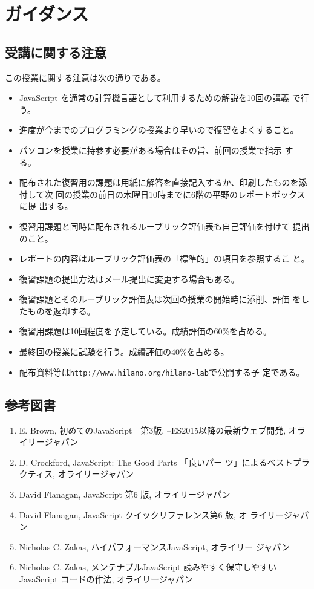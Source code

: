 \chapter{ガイダンス}
\section{受講に関する注意}
この授業に関する注意は次の通りである。
\begin{itemize}
 \item JavaScript を通常の計算機言語として利用するための解説を10回の講義
       で行う。
 \item 進度が今までのプログラミングの授業より早いので復習をよくすること。
 \item パソコンを授業に持参す必要がある場合はその旨、前回の授業で指示
       する。
  \item 配布された復習用の課題は用紙に解答を直接記入するか、印刷したものを添付して次
        回の授業の前日の木曜日10時までに6階の平野のレポートボックスに提
        出する。
 \item 復習用課題と同時に配布されるルーブリック評価表も自己評価を付けて
       提出のこと。
 \item レポートの内容はルーブリック評価表の「標準的」の項目を参照するこ
       と。
 \item 復習課題の提出方法はメール提出に変更する場合もある。
 \item 復習課題とそのルーブリック評価表は次回の授業の開始時に添削、評価
       をしたものを返却する。
 \item 復習用課題は10回程度を予定している。成績評価の60\%を占める。
\item 最終回の授業に試験を行う。成績評価の40\%を占める。
 \item 配布資料等は\texttt{http://www.hilano.org/hilano-lab}で公開する予
       定である。
\end{itemize}
\section{参考図書}

\begin{enumerate}
 \item E. Brown, 初めてのJavaScript　第3版, --ES2015以降の最新ウェブ開発, オラ
       イリージャパン\label{ES2016}
 \item D. Crockford, JavaScript: The Good Parts 「良いパー
	 ツ」によるベストプラ クティス, オライリージャパン\label{goodparats}
 \item David Flanagan, JavaScript 第6 版, オライリージャパン\label{JS6}
 \item David Flanagan, JavaScript クイックリファレンス第6 版, オ\label{JS6ref}
	 ライリージャパン
 \item Nicholas C. Zakas, ハイパフォーマンスJavaScript, オライリー
	 ジャパン\label{JSPerformance}
 \item Nicholas C. Zakas, メンテナブルJavaScript 読みやすく保守しやすいJavaScript 
コードの作法, オライリージャパン
\end{enumerate}
